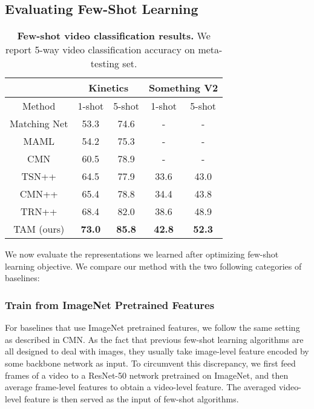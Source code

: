 \documentclass[10pt,twocolumn,letterpaper]{article}
\begin{document}
\subsection{Evaluating Few-Shot Learning}

\begin{table}[bt]
\small
\caption{\textbf{Few-shot video classification results.} We report 5-way video classification accuracy on meta-testing set.}
\vspace{-10pt}
\begin{center}
\begin{tabular}{c|cc|cc}
\hline
       & \multicolumn{2}{c|}{Kinetics}        & \multicolumn{2}{c}{Something V2}     \\ \hline
Method & \multicolumn{1}{c|}{1-shot} & 5-shot & \multicolumn{1}{c|}{1-shot} & 5-shot \\ \hline
Matching Net \cite{zhu2018compound}  &    53.3     & 74.6 & -  & - \\ 
MAML \cite{zhu2018compound}  &    54.2     & 75.3 & -  & - \\ 
CMN \cite{zhu2018compound}  &    60.5     & 78.9 & -  & - \\ 
TSN++ & 64.5  & 77.9 & 33.6 & 43.0   \\  
CMN++ & 65.4  & 78.8 & 34.4 & 43.8  \\
TRN++ & 68.4 & 82.0 & 38.6 & 48.9 \\
TAM (ours) & \textbf{73.0}  & \textbf{85.8} & \textbf{42.8}   & \textbf{52.3}    \\
\hline 
\end{tabular}
\end{center}
\label{main_table}
\end{table}

We now evaluate the representations we learned after optimizing few-shot learning objective. We compare our method with the two following categories of baselines:

\subsubsection{Train from ImageNet Pretrained Features}

For baselines that use ImageNet pretrained features, we follow the same setting as described in CMN. As the fact that previous few-shot learning algorithms are all designed to deal with images, they usually take image-level feature encoded by some backbone network as input. To circumvent this discrepancy, we first feed frames of a video to a ResNet-50 network pretrained on ImageNet, and then average frame-level features to obtain a video-level feature. The averaged video-level feature is then served as the input of few-shot algorithms.
\end{document}
